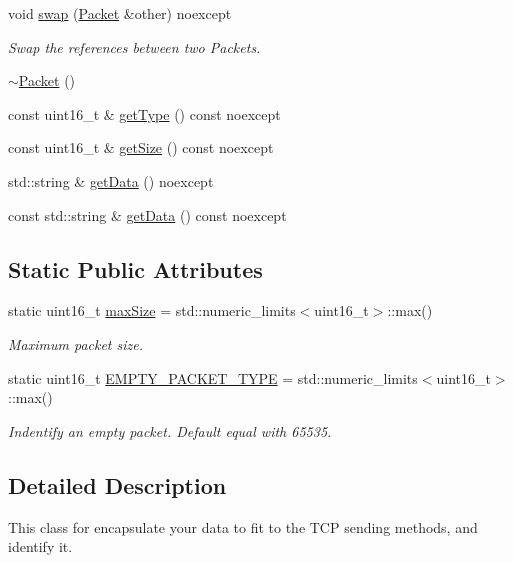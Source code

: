 \begin{DoxyCompactItemize}
\item 
void \hyperlink{classtnnf_1_1_packet_afa0c9cf6ea9d53c3aeb531b72dcaf6b7}{swap} (\hyperlink{classtnnf_1_1_packet}{Packet} \&other) noexcept
\begin{DoxyCompactList}\small\item\em Swap the references between two Packets. \end{DoxyCompactList}\item 
\hyperlink{classtnnf_1_1_packet_a21a1918ce3d69f3a3d91392224455fe4}{$\sim$\+Packet} ()
\item 
const uint16\+\_\+t \& \hyperlink{classtnnf_1_1_packet_a6a3a37ff9e4696a5daaaccf9cfa6b40b}{get\+Type} () const noexcept
\item 
const uint16\+\_\+t \& \hyperlink{classtnnf_1_1_packet_a1382e1973dafd9715db11df4eadaa3ab}{get\+Size} () const noexcept
\item 
std\+::string \& \hyperlink{classtnnf_1_1_packet_a79856254e4539431174cb62323472c64}{get\+Data} () noexcept
\item 
const std\+::string \& \hyperlink{classtnnf_1_1_packet_a13f60df77f40fdbde00138ade60b69b7}{get\+Data} () const noexcept
\end{DoxyCompactItemize}
\subsection*{Static Public Attributes}
\begin{DoxyCompactItemize}
\item 
static uint16\+\_\+t \hyperlink{classtnnf_1_1_packet_a10b2f3efc472cddea13827383b65c8d5}{max\+Size} = std\+::numeric\+\_\+limits$<$uint16\+\_\+t$>$\+::max()
\begin{DoxyCompactList}\small\item\em Maximum packet size. \end{DoxyCompactList}\item 
static uint16\+\_\+t \hyperlink{classtnnf_1_1_packet_a91074632d9be293edd6994bab13d3e18}{E\+M\+P\+T\+Y\+\_\+\+P\+A\+C\+K\+E\+T\+\_\+\+T\+Y\+P\+E} = std\+::numeric\+\_\+limits$<$uint16\+\_\+t$>$\+::max()
\begin{DoxyCompactList}\small\item\em Indentify an empty packet. Default equal with 65535. \end{DoxyCompactList}\end{DoxyCompactItemize}


\subsection{Detailed Description}
This class for encapsulate your data to fit to the T\+C\+P sending methods, and identify it. 

